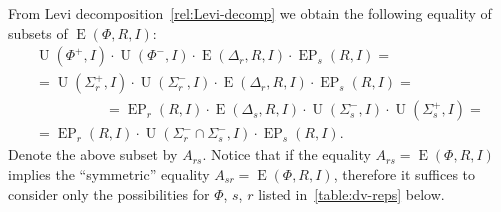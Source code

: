 \documentclass[11pt]{amsart}
\theoremstyle{plain}
\numberwithin{equation}{section}
\numberwithin{lemma}{section}
\theoremstyle{definition}
\theoremstyle{remark}
\DeclareMathOperator{\E}{E}
\DeclareMathOperator{\EP}{EP}
\DeclareMathOperator{\U}{U}
\begin{document}
From Levi decomposition~\eqref{rel:Levi-decomp} we obtain the following equality of subsets of $\E(\Phi, R, I)$:
\begin{multline*}
\U(\Phi^+, I)\cdot \U(\Phi^-, I) \cdot \E(\Delta_r, R, I) \cdot \EP_s(R, I) = \\
= \U(\Sigma_r^+, I)\cdot \U(\Sigma^-_r, I) \cdot \E(\Delta_r, R, I) \cdot \EP_s(R, I) = \hspace{5em} \\
\hspace{5em} = \EP_r(R, I) \cdot \E(\Delta_s, R, I) \cdot \U(\Sigma_s^-, I)\cdot \U(\Sigma_s^+, I) = \\
= \EP_r(R, I) \cdot \U(\Sigma^-_r \cap \Sigma^-_s, I) \cdot \EP_s(R, I).
\end{multline*}
Denote the above subset by $A_{rs}$. 
Notice that if the equality $A_{rs} = \E(\Phi, R, I)$ implies the ``symmetric'' equality $A_{sr} = \E(\Phi, R, I)$, 
 therefore it suffices to consider only the possibilities for $\Phi$, $s$, $r$ listed in~\cref{table:dv-reps} below.
\end{document}
